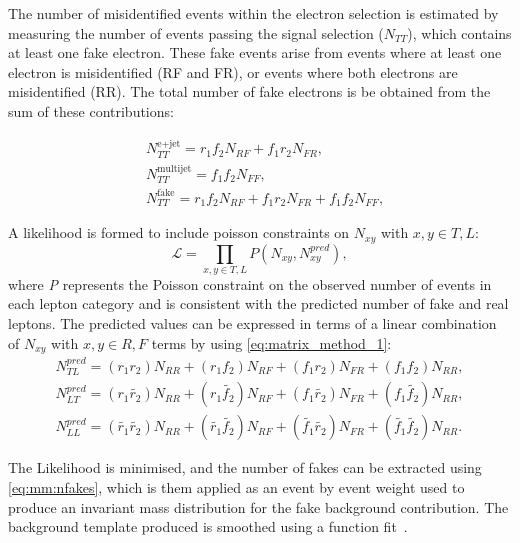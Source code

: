 The number of misidentified events within the electron selection is estimated by measuring the number of events passing the signal selection ($N_{TT}$), which contains at least one fake electron. These fake events arise from events where at least one electron is misidentified (RF and FR), or events where both electrons are misidentified (RR). The total number of fake electrons is be obtained from the sum of these contributions:

\begin{equation}
    \begin{aligned}\label{eq:mm:nfakes}
    & N^{\text{e+jet}}_{TT}=r_1f_2N_{RF}+f_1r_2N_{FR} ,\\ 
    & N^{\text{multijet}}_{TT}=f_1f_2N_{FF} ,\\ 
    & N^{\text{fake}}_{TT}=r_1f_2N_{RF}+f_1r_2N_{FR}+f_1f_2N_{FF} ,
    \end{aligned}
\end{equation}

A likelihood is formed to include poisson constraints on $N_{xy}$ with $x,y \in T,L$:
\begin{equation}
    \mathcal{L} = \prod_{x,y \in T,L} P(N_{xy},N_{xy}^{pred}), 
\end{equation}
where \emph{P} represents the Poisson constraint on the observed number of events in each lepton category and is consistent with the predicted number of fake and real leptons. The predicted values can be expressed in terms of a linear combination of $N_{xy}$ with $x,y \in R,F$ terms by using \cref{eq:matrix_method_1}:
\begin{equation}
    \begin{aligned}
    N_{TL}^{pred} = (r_1r_2)N_{RR} + (r_1f_2)N_{RF} + (f_1r_2)N_{FR} + (f_1f_2)N_{RR},  \\
    N_{LT}^{pred} = (r_1\tilde{r_2})N_{RR} + (r_1\tilde{f_2})N_{RF} + (f_1\tilde{r_2})N_{FR} + (f_1\tilde{f_2})N_{RR}, \\
    N_{LL}^{pred} = (\tilde{r_1}\tilde{r_2})N_{RR} + (\tilde{r_1}\tilde{f_2})N_{RF} + (\tilde{f_1}\tilde{r_2})N_{FR} + (\tilde{f_1}\tilde{f_2})N_{RR}.
    \end{aligned}
\end{equation}

The Likelihood is minimised, and the number of fakes can be extracted using \cref{eq:mm:nfakes}, which is them applied as an event by event weight used to produce an invariant mass distribution for the fake background contribution. The background template produced is smoothed using a function fit~\cite{EXOT-2016-05}. 

